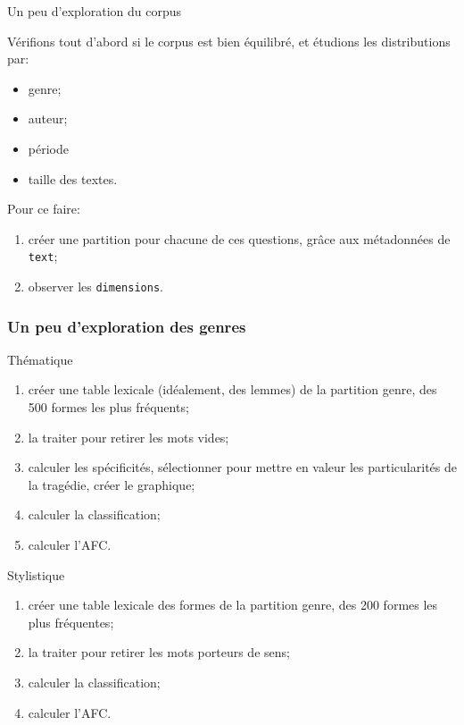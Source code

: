 \documentclass{beamer}
\begin{document}
\begin{frame}{Un peu d'exploration du corpus}
	
	Vérifions tout d'abord si le corpus est bien équilibré, et étudions les distributions par:
	\begin{itemize}
		\item genre;
		\item auteur;
		\item période
		\item taille des textes.
	\end{itemize}

Pour ce faire:
\begin{enumerate}
	\item créer une partition pour chacune de ces questions, grâce aux métadonnées de \texttt{text};
	\item observer les \texttt{dimensions}.
\end{enumerate}
	
\end{frame}



\begin{frame}[shrink]
\frametitle{Un peu d'exploration des genres}
	
	\begin{block}{Thématique}
		
		\begin{enumerate}
			\item créer une table lexicale (idéalement, des lemmes) de la partition genre, des 500 formes les plus fréquents;
			\item la traiter pour retirer les mots vides;
			\item calculer les spécificités, sélectionner pour mettre en valeur les particularités de la tragédie, créer le graphique;
			\item calculer la classification;
			\item calculer l'AFC.
		\end{enumerate}
	\end{block}

\begin{block}{Stylistique}
	
	\begin{enumerate}
		\item créer une table lexicale des formes de la partition genre, des 200 formes les plus fréquentes;
		\item la traiter pour retirer les mots porteurs de sens;
		\item calculer la classification;
		\item calculer l'AFC.
	\end{enumerate}
\end{block}
	
\end{frame}
\end{document}
